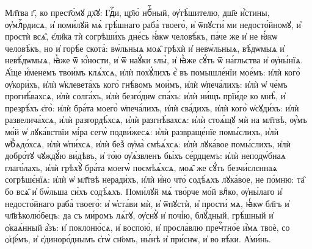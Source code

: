 \documentclass[20pt]{extarticle}
\begin{document}
Мл҃тва г҃, ко прест҃о́мꙋ дх҃ꙋ:
Гдⷭ҇и, цр҃ю̀ нбⷭ҇ный, ѹ҆тѣ́шителю, дш҃е и҆́стины, ѹ҆млⷭ҇рдисѧ, и҆ поми́лꙋй мѧ̀ грѣ́шнаго раба̀ твоего̀, и҆ ѿпꙋсти́ ми недосто́йномꙋ, и҆ простѝ всѧ̑, є҆ли̑ка тѝ согрѣши́хъ дне́сь ꙗ҆́кѡ человѣ́къ, па́че же и҆ не ꙗ҆́кѡ человѣ́къ, но и҆ горѣ́е скота̀: вѡ́льныѧ моѧ̑ грѣхѝ и҆ невѡ́льныѧ, вѣ́дѡмыѧ и҆ невѣ́дѡмыѧ, ꙗ҆̀же ѿ ю҆́ности, и҆ ѿ наꙋ́ки ѕлы̀, и҆ ꙗ҆̀же сꙋ́ть ѿ на́гльства и҆ ѹ҆ны́нїѧ. А҆́ще и҆́менемъ твои́мъ клѧ́хсѧ, и҆лѝ похꙋ́лихъ є҆̀ въ помышле́нїи мое́мъ: и҆лѝ кого̀ ѹ҆кори́хъ, и҆лѝ ѡ҆клевета́хъ кого̀ гнѣ́вомъ мои́мъ, и҆лѝ ѡ҆печа́лихъ: и҆лѝ ѡ҆ че́мъ прогнѣ́вахсѧ, и҆лѝ солга́хъ, и҆лѝ безго́днѡ спа́хъ: и҆лѝ ни́щъ прїи́де ко мнѣ̀, и҆ презрѣ́хъ є҆го̀: и҆лѝ бра́та моего̀ ѡ҆печа́лихъ, и҆лѝ сва́дихъ, и҆лѝ кого̀ ѡ҆сꙋди́хъ: и҆лѝ развелича́хсѧ, и҆лѝ разгордѣ́хсѧ, и҆лѝ разгнѣ́вахсѧ: и҆лѝ стоѧ́щꙋ мѝ на мл҃твѣ, ѹ҆́мъ мо́й ѡ҆ лꙋка́вствїи мі́ра сегѡ̀ подви́жесѧ: и҆лѝ развраще́нїе помы́слихъ, и҆лѝ ѡ҆б꙽ѧдо́хсѧ, и҆лѝ ѡ҆пи́хсѧ, и҆лѝ без꙽ ѹ҆ма̀ смѣѧ́хсѧ: и҆лѝ лꙋка́вое помы́слихъ, и҆лѝ добро́тꙋ чꙋждꙋ́ю ви́дѣвъ, и҆ то́ю ѹ҆ѧ́звленъ бы́хъ се́рдцемъ: и҆лѝ неподѡ́бнаѧ глаго́лахъ, и҆лѝ грѣхꙋ̀ бра́та моегѡ̀ посмѣѧ́хсѧ, моѧ̑ же сꙋ́ть безчи́слєннаѧ согрѣшє́нїѧ: и҆лѝ ѡ҆ мл҃твѣ неради́хъ, и҆лѝ и҆́но что̀ содѣ́ѧхъ лꙋка́вое, не по́мню: та̑ бо всѧ̑ и҆ бѡ́льша си́хъ содѣ́ѧхъ. Поми́лꙋй мѧ̀ тво́рче мо́й влⷣко, ѹ҆ны́лаго и҆ недосто́йнаго раба̀ твоего̀: и҆ ѡ҆ста́ви мѝ, и҆ ѿпꙋстѝ, и҆ прости́ мѧ, ꙗ҆́кѡ бл҃гъ и҆ чл҃вѣколю́бецъ: да съ ми́ромъ лѧ́гꙋ, ѹ҆снꙋ̀ и҆ почі́ю, блꙋ́дный, грѣ́шный и҆ ѻ҆каѧ́нный а҆́зъ: и҆ поклоню́сѧ, и҆ воспою̀, и҆ просла́влю пречⷭ҇тно́е и҆́мѧ твоѐ, со ѻ҆ц҃е́мъ, и҆ є҆диноро́днымъ є҆гѡ̀ сн҃омъ, ны́нѣ и҆ при́снѡ, и҆ во вѣ́ки. А҆ми́нь.
\end{document}
